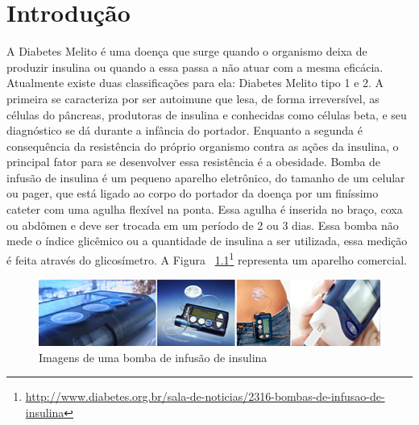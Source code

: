 \chapter{Introdução}
A Diabetes Melito é uma doença que surge quando o organismo deixa de produzir insulina ou quando a essa passa a não atuar com a mesma eficácia. Atualmente existe duas classificações para ela: Diabetes Melito tipo 1 e 2. A primeira se caracteriza por ser autoimune que lesa, de forma irreversível, as células do pâncreas, produtoras de insulina e conhecidas como células beta, e seu diagnóstico se dá durante a infância do portador. Enquanto a segunda é consequência da resistência do próprio organismo contra as ações da insulina, o principal fator para se desenvolver essa resistência é a obesidade\cite{portaldiabetes2008}.
Bomba de infusão de insulina é um pequeno aparelho eletrônico, do tamanho de um celular ou pager, que está ligado ao corpo do portador da doença por um finíssimo cateter com uma agulha flexível na ponta. Essa agulha é inserida no braço, coxa ou abdômen e deve ser trocada em um período de 2 ou 3 dias. Essa bomba não mede o índice glicêmico ou a quantidade de insulina a ser utilizada, essa medição é feita através do glicosímetro. A Figura ~\ref{fig:bombainfusao}\footnote{\url{http://www.diabetes.org.br/sala-de-noticias/2316-bombas-de-infusao-de-insulina}} representa um aparelho comercial.

\begin{figure}[htp]
	\centering
	\includegraphics[scale=1]{images/bombainsulina.png}
	\caption{Imagens de uma bomba de infusão de insulina}	
	\label{fig:bombainfusao}	
\end{figure}


